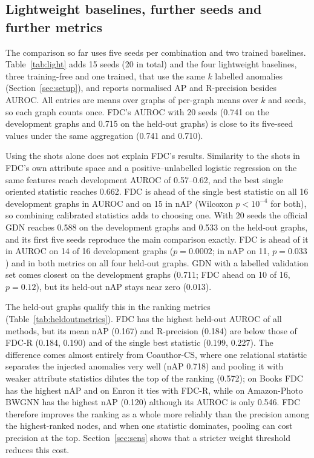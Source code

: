\documentclass[pdflatex,sn-mathphys-ay]{sn-jnl}
\theoremstyle{plain}
\theoremstyle{remark}
\begin{document}
\subsection{Lightweight baselines, further seeds and further metrics}\label{sec:light}

The comparison so far uses five seeds per combination and two trained baselines. Table~\ref{tab:light} adds 15 seeds (20 in total) and the four lightweight baselines, three training-free and one trained, that use the same $k$ labelled anomalies (Section~\ref{sec:setup}), and reports normalised AP and R-precision besides AUROC. All entries are means over graphs of per-graph means over $k$ and seeds, so each graph counts once. FDC's AUROC with 20 seeds (0.741 on the development graphs and 0.715 on the held-out graphs) is close to its five-seed values under the same aggregation (0.741 and 0.710).

Using the shots alone does not explain FDC's results. Similarity to the shots in FDC's own attribute space and a positive--unlabelled logistic regression on the same features reach development AUROC of 0.57--0.62, and the best single oriented statistic reaches 0.662. FDC is ahead of the single best statistic on all 16 development graphs in AUROC and on 15 in nAP (Wilcoxon $p<10^{-4}$ for both), so combining calibrated statistics adds to choosing one. With 20 seeds the official GDN reaches 0.588 on the development graphs and 0.533 on the held-out graphs, and its first five seeds reproduce the main comparison exactly. FDC is ahead of it in AUROC on 14 of 16 development graphs ($p=0.0002$; in nAP on 11, $p=0.033$) and in both metrics on all four held-out graphs. GDN with a labelled validation set comes closest on the development graphs (0.711; FDC ahead on 10 of 16, $p=0.12$), but its held-out nAP stays near zero (0.013).

The held-out graphs qualify this in the ranking metrics (Table~\ref{tab:heldoutmetrics}). FDC has the highest held-out AUROC of all methods, but its mean nAP (0.167) and R-precision (0.184) are below those of FDC-R (0.184, 0.190) and of the single best statistic (0.199, 0.227). The difference comes almost entirely from Coauthor-CS, where one relational statistic separates the injected anomalies very well (nAP 0.718) and pooling it with weaker attribute statistics dilutes the top of the ranking (0.572); on Books FDC has the highest nAP and on Enron it ties with FDC-R, while on Amazon-Photo BWGNN has the highest nAP (0.120) although its AUROC is only 0.546. FDC therefore improves the ranking as a whole more reliably than the precision among the highest-ranked nodes, and when one statistic dominates, pooling can cost precision at the top. Section~\ref{sec:sens} shows that a stricter weight threshold reduces this cost.
\end{document}
